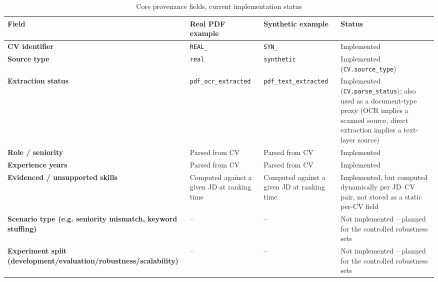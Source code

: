 \documentclass[12pt,a4paper,oneside]{report}
\begin{document}
\begin{table}[htbp]
\centering
\caption{Core provenance fields, current implementation status}
\label{tab:provenance}
\begin{tabularx}{\textwidth}{>{\bfseries}p{}p{}p{}X}
\toprule
Field & Real PDF example & Synthetic example & Status \\
\midrule
CV identifier & \texttt{REAL\_} & \texttt{SYN\_} & Implemented \\
Source type & \texttt{real} & \texttt{synthetic} & Implemented (\texttt{CV.\allowbreak source\_\allowbreak type}) \\
Extraction status & \texttt{pdf\_\allowbreak ocr\_\allowbreak extracted} & \texttt{pdf\_\allowbreak text\_\allowbreak extracted} & Implemented (\texttt{CV.\allowbreak parse\_\allowbreak status}); also used as a document-type proxy (OCR implies a scanned source, direct extraction implies a text-layer source) \\
Role / seniority & Parsed from CV & Parsed from CV & Implemented \\
Experience years & Parsed from CV & Parsed from CV & Implemented \\
Evidenced / unsupported skills & Computed against a given JD at ranking time & Computed against a given JD at ranking time & Implemented, but computed dynamically per JD--CV pair, not stored as a static per-CV field \\
Scenario type (e.g. seniority mismatch, keyword stuffing) & -- & -- & Not implemented -- planned for the controlled robustness sets \\
Experiment split (development/evaluation/robustness/scalability) & -- & -- & Not implemented -- planned for the controlled robustness sets \\
\bottomrule
\end{tabularx}
\end{table}
\end{document}
